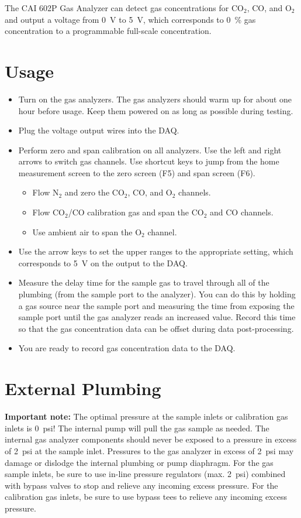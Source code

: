 \documentclass[11pt,oneside]{book}
\begin{document}
The CAI 602P Gas Analyzer can detect gas concentrations for CO$_2$, CO, and O$_2$ and output a voltage from 0~V to 5~V, which corresponds to 0~\% gas concentration to a programmable full-scale concentration.

\section{Usage}

\begin{itemize}
\item Turn on the gas analyzers. The gas analyzers should warm up for about one hour before usage. Keep them powered on as long as possible during testing.
\item Plug the voltage output wires into the DAQ.
\item Perform zero and span calibration on all analyzers. Use the left and right arrows to switch gas channels. Use shortcut keys to jump from the home measurement screen to the zero screen (F5) and span screen (F6).
    \begin{itemize}
    \item Flow N$_2$ and zero the CO$_2$, CO, and O$_2$ channels.
    \item Flow CO$_2$/CO calibration gas and span the CO$_2$ and CO channels.
    \item Use ambient air to span the O$_2$ channel.
    \end{itemize}
\item Use the arrow keys to set the upper ranges to the appropriate setting, which corresponds to 5~V on the output to the DAQ.
\item Measure the delay time for the sample gas to travel through all of the plumbing (from the sample port to the analyzer). You can do this by holding a gas source near the sample port and measuring the time from exposing the sample port until the gas analyzer reads an increased value. Record this time so that the gas concentration data can be offset during data post-processing.
\item You are ready to record gas concentration data to the DAQ.
\end{itemize}

\section{External Plumbing}

{\bf Important note:} The optimal pressure at the sample inlets or calibration gas inlets is 0~psi! The internal pump will pull the gas sample as needed. The internal gas analyzer components should never be exposed to a pressure in excess of 2~psi at the sample inlet. Pressures to the gas analyzer in excess of 2~psi may damage or dislodge the internal plumbing or pump diaphragm. For the gas sample inlets, be sure to use in-line pressure regulators (max. 2~psi) combined with bypass valves to stop and relieve any incoming excess pressure. For the calibration gas inlets, be sure to use bypass tees to relieve any incoming excess pressure.
\end{document}
